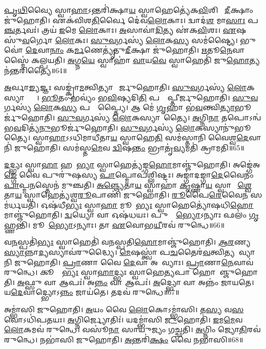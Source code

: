 \ul{𑌪𑍃}\ul{𑌥𑌿}𑌵𑍍𑌯𑍈 𑌸𑍍𑌵𑌾\ul{𑌹𑌾}\-𑌽𑌨𑍍𑌤𑌰𑌿॑𑌕𑍍𑌷𑌾\ul{𑌯} 𑌸𑍍𑌵𑌾𑌹𑍇𑌤𑍍𑌯𑍇॑𑌕\ul{𑌵𑌿}\ul{}𑌶𑌿𑌨𑍀𑌂᳚ \ul{𑌦𑍀}𑌕𑍍𑌷𑌾𑌂 𑌜𑍁॑𑌹𑍋𑌤𑌿।
𑌏𑌕॑𑌵𑌿𑌶\ul{𑌤𑌿}𑌰𑍍𑌵𑍈 𑌦𑍇॑𑌵\ul{𑌲𑍋}𑌕𑌾𑌃।
𑌦𑍍𑌵𑌾𑌦॑\ul{𑌶} 𑌮𑌾\ul{𑌸𑌾𑌃} 𑌪\ul{𑌞𑍍𑌚}𑌰𑍍𑌤𑌵𑌃॑।
𑌤𑍍𑌰𑌯॑ \ul{𑌇}𑌮𑍇 \ul{𑌲𑍋}𑌕𑌾𑌃।
\ul{𑌅}𑌸𑌾𑌵𑌾॑\ul{𑌦𑌿}𑌤𑍍𑌯 𑌏॑𑌕\ul{𑌵𑌿}\ul{}𑌶𑌃।
\ul{𑌏}𑌷 𑌸𑍁॑\ul{𑌵}𑌰𑍍𑌗𑍋 \ul{𑌲𑍋}𑌕𑌃।
\ul{𑌸𑍁}\ul{𑌵}𑌰𑍍𑌗𑌸𑍍𑌯॑ \ul{𑌲𑍋}𑌕\ul{𑌸𑍍𑌯} 𑌸𑌮॑𑌷𑍍𑌟𑍍𑌯𑍈।
𑌭𑍁𑌵𑍋॑ \ul{𑌦𑍇}𑌵𑌾\ul{𑌨𑌾𑌂} 𑌕\ul{𑌰𑍍𑌮}𑌣𑍇𑌤𑍍𑌯𑍃॑𑌤𑍁\ul{𑌦𑍀}𑌕𑍍𑌷𑌾 𑌜𑍁॑𑌹𑍋𑌤𑌿।
\ul{𑌋}𑌤𑍂\ul{𑌨𑍇}𑌵𑌾𑌸𑍍𑌮𑍈॑ 𑌕𑌲𑍍𑌪𑌯𑌤𑌿।
\ul{𑌅}𑌗𑍍𑌨\ul{𑌯𑍇} 𑌸𑍍𑌵𑌾𑌹𑌾॑ \ul{𑌵𑌾}𑌯\ul{𑌵𑍇} 𑌸𑍍𑌵𑌾𑌹𑍇𑌤𑌿॑ 𑌜𑍁\ul{𑌹𑍋}𑌤𑍍𑌯𑌨॑𑌨𑍍𑌤𑌰𑌿𑌤𑍍𑌯𑍈॥64॥

\ul{𑌅}𑌰𑍍𑌵𑌾\ul{𑌙𑍍𑌯}𑌜𑍍𑌞𑌃 𑌸𑌙𑍍𑌕𑍍𑌰𑌾॑\ul{𑌮}𑌤𑍍𑌵𑌿𑌤𑍍𑌯𑌾𑌪𑍍𑌤𑍀᳚𑌰𑍍𑌜𑍁𑌹𑍋𑌤𑌿।
\ul{𑌸𑍁}\ul{𑌵}𑌰𑍍𑌗𑌸𑍍𑌯॑ \ul{𑌲𑍋}𑌕𑌸𑍍𑌯𑌾𑌪𑍍𑌤𑍍𑌯𑍈᳚।
\ul{𑌭𑍂}𑌤𑌂 𑌭𑌵𑍍𑌯𑌂॑ 𑌭\ul{𑌵𑌿}𑌷𑍍𑌯𑌦𑌿\ul{𑌤𑌿} 𑌪𑌰𑍍𑌯𑌾᳚𑌪𑍍𑌤𑍀𑌰𑍍𑌜𑍁𑌹𑍋𑌤𑌿।
\ul{𑌸𑍁}\ul{𑌵}𑌰𑍍𑌗𑌸𑍍𑌯॑ \ul{𑌲𑍋}𑌕\ul{𑌸𑍍𑌯} 𑌪𑌰𑍍𑌯𑌾᳚𑌪𑍍𑌤𑍍𑌯𑍈।
𑌆 𑌮𑍇॑ \ul{𑌗𑍃}𑌹𑌾 𑌭॑\ul{𑌵}𑌨𑍍𑌤𑍍𑌵𑌿\ul{𑌤𑍍𑌯𑌾}𑌭𑍂𑌰𑍍𑌜𑍁॑𑌹𑍋𑌤𑌿।
\ul{𑌸𑍁}\ul{𑌵}𑌰𑍍𑌗𑌸𑍍𑌯॑ \ul{𑌲𑍋}𑌕𑌸𑍍𑌯𑌾𑌭𑍂᳚𑌤𑍍𑌯𑍈।
\ul{𑌅}𑌗𑍍𑌨𑌿\ul{𑌨𑌾} 𑌤𑌪𑍋\-𑌽𑌨𑍍𑌵॑𑌭\ul{𑌵}𑌦𑌿𑌤𑍍𑌯॑\ul{𑌨𑍁}𑌭𑍂𑌰𑍍𑌜𑍁॑𑌹𑍋𑌤𑌿।
\ul{𑌸𑍁}\ul{𑌵}𑌰𑍍𑌗𑌸𑍍𑌯॑ \ul{𑌲𑍋}𑌕𑌸𑍍𑌯𑌾𑌨𑍁॑𑌭𑍂𑌤𑍍𑌯𑍈।
𑌸𑍍𑌵𑌾\ul{𑌹𑌾}\-𑌽𑌽𑌧𑌿𑌮𑌾𑌧𑍀॑𑌤𑌾\ul{𑌯} 𑌸𑍍𑌵𑌾𑌹𑍇\ul{𑌤𑌿} 𑌸𑌮॑𑌸𑍍𑌤𑌾𑌨𑌿 𑌵𑍈𑌶𑍍𑌵\ul{𑌦𑍇}𑌵𑌾𑌨𑌿॑ 𑌜𑍁𑌹𑍋𑌤𑌿।
𑌸𑌮॑𑌸𑍍𑌤\ul{𑌮𑍇}𑌵 \ul{𑌦𑍍𑌵𑌿}𑌷\ul{𑌨𑍍𑌤𑌂} 𑌭𑍍𑌰𑌾𑌤𑍃॑\ul{𑌵𑍍𑌯}𑌮𑌤𑌿॑ 𑌕𑍍𑌰𑌾𑌮𑌤𑌿॥65॥

\ul{𑌦}𑌦𑍍𑌭𑍍𑌯𑌃 𑌸𑍍𑌵𑌾\ul{𑌹𑌾} 𑌹𑌨𑍂᳚\ul{𑌭𑍍𑌯𑌾}\ul{} 𑌸𑍍𑌵𑌾𑌹𑍇𑌤𑍍𑌯॑𑌙𑍍𑌗\ul{𑌹𑍋}𑌮𑌾𑌞𑍍𑌜𑍁॑𑌹𑍋𑌤𑌿।
𑌅𑌙𑍍𑌗𑍇॑𑌅\ul{𑌙𑍍𑌗𑍇} 𑌵𑍈 𑌪𑍁𑌰𑍁॑𑌷𑌸𑍍𑌯 \ul{𑌪𑌾}𑌪𑍍𑌮𑍋𑌪॑𑌶𑍍𑌲𑌿𑌷𑍍𑌟𑌃।
𑌅𑌙𑍍𑌗𑌾॑𑌦𑌙𑍍𑌗𑌾\ul{𑌦𑍇}𑌵𑍈𑌨𑌂॑ \ul{𑌪𑌾}𑌪𑍍𑌮\ul{𑌨}𑌸𑍍𑌤𑍇𑌨॑ 𑌮𑍁𑌞𑍍𑌚𑌤𑌿।
\ul{𑌅}\ul{𑌞𑍍𑌜𑍍𑌯𑍇}𑌤𑌾\ul{𑌯} 𑌸𑍍𑌵𑌾𑌹𑌾॑ \ul{𑌕𑍃}𑌷𑍍𑌣𑌾\ul{𑌯} 𑌸𑍍𑌵𑌾𑌹𑌾᳚ \ul{𑌶𑍍𑌵𑍇}𑌤𑌾\ul{𑌯} 𑌸𑍍𑌵𑌾𑌹𑍇𑌤𑍍𑌯॑𑌶𑍍𑌵\ul{𑌰𑍂}𑌪𑌾𑌣𑌿॑ 𑌜𑍁𑌹𑍋𑌤𑌿।
\ul{𑌰𑍂}𑌪𑍈\ul{𑌰𑍇}𑌵𑍈\ul{𑌨}\ul{} 𑌸𑌮॑𑌰𑍍𑌧𑌯𑌤𑌿।
𑌓𑌷॑𑌧𑍀\ul{𑌭𑍍𑌯𑌃} 𑌸𑍍𑌵𑌾\ul{𑌹𑌾} 𑌮𑍂𑌲𑍇᳚\ul{𑌭𑍍𑌯𑌃} 𑌸𑍍𑌵𑌾𑌹𑍇𑌤𑍍𑌯𑍋॑𑌷𑌧𑌿\ul{𑌹𑍋}𑌮𑌾𑌞𑍍𑌜𑍁॑𑌹𑍋𑌤𑌿।
\ul{𑌦𑍍𑌵}𑌯𑍍𑌯𑍋 𑌵𑌾 𑌓𑌷॑𑌧𑌯𑌃।
𑌪𑍁𑌷𑍍𑌪𑍇᳚\ul{𑌭𑍍𑌯𑍋}\-𑌽𑌨𑍍𑌯𑌾𑌃 𑌫𑌲𑌂॑ \ul{𑌗𑍃}𑌹𑍍𑌣𑌨𑍍𑌤𑌿॑।
𑌮𑍂𑌲𑍇᳚\ul{𑌭𑍍𑌯𑍋}\-𑌽𑌨𑍍𑌯𑌾𑌃।
𑌤𑌾 \ul{𑌏}𑌵𑍋𑌭\ul{𑌯𑍀}𑌰𑌵॑ 𑌰𑍁𑌨𑍍𑌧𑍇॥66॥

𑌵\ul{𑌨}𑌸𑍍𑌪𑌤𑌿॑\ul{𑌭𑍍𑌯𑌃} 𑌸𑍍𑌵𑌾𑌹𑍇𑌤𑌿॑ 𑌵𑌨𑌸𑍍𑌪𑌤𑌿\ul{𑌹𑍋}𑌮𑌾𑌞𑍍𑌜𑍁॑𑌹𑍋𑌤𑌿।
\ul{𑌆}\ul{𑌰}𑌣𑍍𑌯\ul{𑌸𑍍𑌯𑌾}𑌨𑍍𑌨𑌾\ul{𑌦𑍍𑌯}𑌸𑍍𑌯𑌾𑌵॑𑌰𑍁𑌦𑍍𑌧𑍍𑌯𑍈।
\ul{𑌮𑍇}𑌷𑌸𑍍𑌤𑍍𑌵𑌾॑ 𑌪\ul{𑌚}𑌤𑍈𑌰॑\ul{𑌵}𑌤𑍍𑌵𑌿𑌤𑍍𑌯𑌪𑌾᳚𑌵𑍍𑌯𑌾𑌨𑌿 𑌜𑍁𑌹𑍋𑌤𑌿।
\ul{𑌪𑍍𑌰𑌾}𑌣𑌾 𑌵𑍈 \ul{𑌦𑍇}𑌵𑌾 𑌅𑌪𑌾᳚𑌵𑍍𑌯𑌾𑌃।
\ul{𑌪𑍍𑌰𑌾}𑌣𑌾\ul{𑌨𑍇}𑌵𑌾𑌵॑ 𑌰𑍁𑌨𑍍𑌧𑍇।
𑌕𑍂𑌪𑍍𑌯𑌾᳚\ul{𑌭𑍍𑌯𑌃} 𑌸𑍍𑌵𑌾\ul{𑌹𑌾}𑌦𑍍𑌭𑍍𑌯𑌃 𑌸𑍍𑌵𑌾𑌹𑍇\ul{𑌤𑍍𑌯}𑌪𑌾 𑌹𑍋𑌮𑌾᳚𑌞𑍍𑌜𑍁𑌹𑍋𑌤𑌿।
\ul{𑌅}𑌫𑍍𑌸𑍁 𑌵𑌾 𑌆𑌪𑌃॑।
𑌅\ul{𑌨𑍍𑌨𑌂} 𑌵𑌾 𑌆𑌪𑌃॑।
\ul{𑌅}𑌦𑍍𑌭𑍍𑌯𑍋 𑌵𑌾 𑌅𑌨𑍍𑌨𑌂॑ 𑌜𑌾𑌯𑌤𑍇।
𑌯\ul{𑌦𑍇}𑌵𑌾𑌦𑍍𑌭𑍍𑌯𑍋\-𑌽\ul{𑌨𑍍𑌨𑌂} 𑌜𑌾𑌯॑𑌤𑍇।
𑌤𑌦𑌵॑ 𑌰𑍁𑌨𑍍𑌧𑍇॥67॥\anuvakamend[\ul{𑌪𑍂}\ul{𑌰𑍍𑌵}\ul{𑌦𑍀}𑌕𑍍𑌷𑌾 𑌜𑍁॑𑌹𑍋\ul{𑌤𑌿} 𑌪𑍂𑌰𑍍𑌵॑ \ul{𑌏}𑌵 \ul{𑌦𑍍𑌵𑌿}𑌷\ul{𑌨𑍍𑌤𑌂} 𑌭𑍍𑌰𑌾𑌤𑍃॑\ul{𑌵𑍍𑌯}𑌮𑌤𑌿॑ 𑌕𑍍𑌰𑌾\ul{𑌮}𑌤𑍍𑌯𑌨॑𑌨𑍍𑌤𑌰𑌿𑌤𑍍𑌯𑍈 𑌕𑍍𑌰𑌾𑌮𑌤𑌿 𑌰𑍁\ul{𑌨𑍍𑌧𑍇} 𑌜𑌾𑌯॑\ul{𑌤} 𑌏𑌕𑌂॑ 𑌚]

𑌅𑌮𑍍𑌭𑌾॑𑌸𑌿 𑌜𑍁𑌹𑍋𑌤𑌿।
\ul{𑌅}𑌯𑌂 𑌵𑍈 \ul{𑌲𑍋}𑌕𑍋\-𑌽𑌮𑍍𑌭𑌾॑𑌸𑌿।
𑌤\ul{𑌸𑍍𑌯} 𑌵\ul{𑌸}𑌵𑍋\-𑌽𑌧𑌿॑𑌪𑌤𑌯𑌃।
\ul{𑌅}𑌗𑍍𑌨𑌿𑌰𑍍𑌜𑍍𑌯𑍋𑌤𑌿𑌃॑।
𑌯𑌦𑌮𑍍𑌭𑌾॑𑌸𑌿 \ul{𑌜𑍁}𑌹𑍋𑌤𑌿॑।
\ul{𑌇}𑌮\ul{𑌮𑍇}𑌵 \ul{𑌲𑍋}𑌕𑌮𑌵॑ 𑌰𑍁𑌨𑍍𑌧𑍇।
𑌵𑌸𑍂॑\ul{𑌨𑌾}\ul{} 𑌸𑌾𑌯𑍁॑𑌜𑍍𑌯𑌂 𑌗𑌚𑍍𑌛𑌤𑌿।
\ul{𑌅}𑌗𑍍𑌨𑌿𑌂 𑌜𑍍𑌯𑍋\ul{𑌤𑌿}𑌰𑌵॑ 𑌰𑍁𑌨𑍍𑌧𑍇।
𑌨𑌭𑌾॑𑌸𑌿 𑌜𑍁𑌹𑍋𑌤𑌿।
\ul{𑌅}𑌨𑍍𑌤𑌰𑌿॑\ul{𑌕𑍍𑌷𑌂} 𑌵𑍈 𑌨𑌭𑌾॑𑌸𑌿॥68॥

